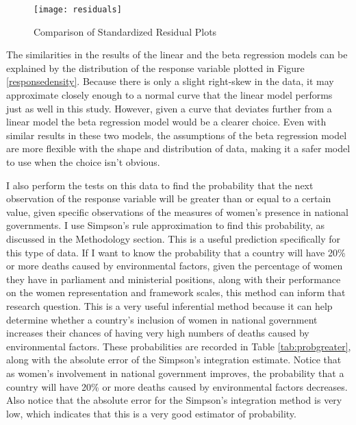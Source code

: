\documentclass{svproc}
\begin{document}
\begin{figure}
\begin{center}
\caption{Comparison of Standardized Residual Plots}
\texttt{[image: residuals]}
\label{residuals}
\smallskip
\end{center}
\end{figure}

The similarities in the results of the linear and the beta regression models can be explained by the distribution of the response variable plotted in Figure \ref{responsedensity}. Because there is only a slight right-skew in the data, it may approximate closely enough to a normal curve that the linear model performs just as well in this study. However, given a curve that deviates further from a linear model the beta regression model would be a clearer choice. Even with similar results in these two models, the assumptions of the beta regression model are more flexible with the shape and distribution of data, making it a safer model to use when the choice isn't obvious.

I also perform the tests on this data to find the probability that the next observation of the response variable will be greater than or equal to a certain value, given specific observations of the measures of women's presence in national governments. I use Simpson's rule approximation to find this probability, as discussed in the Methodology section. This is a useful prediction specifically for this type of data. If I want to know the probability that a country will have 20\% or more deaths caused by environmental factors, given the percentage of women they have in parliament and ministerial positions, along with their performance on the women representation and framework scales, this method can inform that research question. This is a very useful inferential method because it can help determine whether a country's inclusion of women in national government increases their chances of having very high numbers of deaths caused by environmental factors. These probabilities are recorded in Table \ref{tab:probgreater}, along with the absolute error of the Simpson's integration estimate. Notice that as women's involvement in national government improves, the probability that a country will have 20\% or more deaths caused by environmental factors decreases. Also notice that the absolute error for the Simpson's integration method is very low, which indicates that this is a very good estimator of probability.
\end{document}
